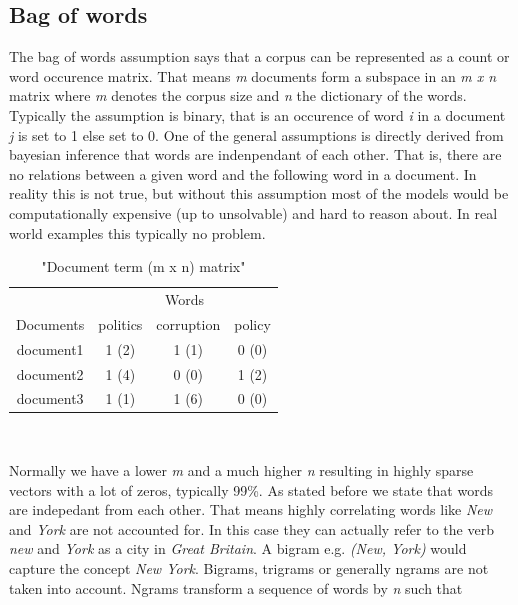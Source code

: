   \subsection{Bag of words}
    The bag of words assumption says that a corpus can be represented as a count or word occurence matrix. That means \emph{m} documents form a subspace in an \emph{m x n} matrix where \emph{m} denotes the corpus size and \emph{n} the dictionary of the words. Typically the assumption is binary, that is an occurence of word \emph{i} in a document \emph{j} is set to 1 else set to 0. One of the general assumptions is directly derived from bayesian inference that words are indenpendant of each other. That is, there are no relations between a given word and the following word in a document. In reality this is not true, but without this assumption most of the models would be computationally expensive (up to unsolvable) and hard to reason about. In real world examples this typically no problem. \cite{Nothing}

    \begin{table}[h!]
      \centering
      \begin{tabular}{c|c|c|c}
        \multicolumn{1}{r|}{} & \multicolumn{3}{c}{Words} \\
        \cline{1-4}
        Documents &   politics &   corruption &  policy  \\
        \hline
        document1 &    1 (2)   &     1 (1)    &   0 (0)  \\
        document2 &    1 (4)   &     0 (0)    &   1 (2)  \\
        document3 &    1 (1)   &     1 (6)    &   0 (0)  \\
      \end{tabular}\\
      \caption{"Document term (m x n) matrix"}
    \end{table}

    Normally we have a lower \emph{m} and a much higher \emph{n} resulting in highly sparse vectors with a lot of zeros, typically 99\%. As stated before we state that words are indepedant from each other. That means highly correlating words like \emph{New} and \emph{York} are not accounted for. In this case they can actually refer to the verb \emph{new} and \emph{York} as a city in \emph{Great Britain}. A bigram e.g. \emph{(New, York)} would capture the concept \emph{New York}. Bigrams, trigrams or generally ngrams are not taken into account. Ngrams transform a sequence of words by \emph{n} such that 

